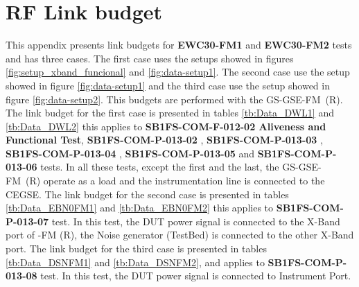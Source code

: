 \section{RF Link budget} \label{an:rf-link-budget}
\newcommand{\cod}{SB1FS-COM-}

 

This appendix presents link budgets for \textbf{EWC30-FM1} and \textbf{EWC30-FM2} 
tests and has three cases.
The first case uses the setups showed in figures \ref{fig:setup_xband_funcional} and  \ref{fig:data-setup1}.
The second case use the setup showed in figure \ref{fig:data-setup1} and 
the third case use the setup showed in figure \ref{fig:data-setup2}. This budgets are performed with the 
GS-GSE-FM~(R). The link budget for the first case is presented in tables \ref{tb:Data_DWL1} and 
\ref{tb:Data_DWL2} this applies to \textbf{\cod{F-012-02} Aliveness and Functional Test}, 
\textbf{\cod{P-013-02} \TestPerfRFPXA}, \textbf{\cod{P-013-03} \TestPerfCCDF}, 
\textbf{\cod{P-013-04} \TestPerfFreqS}, \textbf{\cod{P-013-05} \TestPerfCWPhaseN} and 
\textbf{\cod{P-013-06} \TestPerfFilterVector} tests. In all these tests, except the first and the last,
 the GS-GSE-FM~(R) operate as a load and the instrumentation line is connected to the CEGSE. 
 The link budget for the second case is presented in tables \ref{tb:Data_EBN0FM1} and \ref{tb:Data_EBN0FM2} 
 this applies to \textbf{\cod{P-013-07} \TestPerfBer} test. 
In this test, the DUT power signal is connected to the X-Band port of \gse-FM (R), the Noise generator 
(TestBed) is connected to the other X-Band port. The link budget for the third case is 
presented in tables \ref{tb:Data_DSNFM1} and \ref{tb:Data_DSNFM2}, 
and applies to \textbf{\cod{P-013-08} \TestPerfSpuriousDSN}
test. In this test, the DUT power signal is connected to Instrument Port.\\
\vspace{0.5cm}

